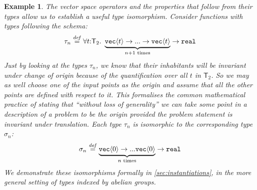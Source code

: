 \documentclass{sigplanconf}
\newcommand{\SynTransl}[1]{\mathsf{T}_#1}
\newcommand{\tyPrim}[2]{\textup{\texttt{#1}}\langle #2 \rangle}
\newcommand{\tyPrimNm}[1]{\textup{\texttt{#1}}}
\newcommand{\isDefinedAs}{\stackrel{\mathit{def}}=}
\theoremstyle{examplestyle}
\newtheorem{example}{Example}
\theoremstyle{restatementstyle}
\begin{document}
\begin{example}\label{ex:type-iso}
  The vector space operators and the properties that follow from their
  types allow us to establish a useful type isomorphism. Consider
  functions with types following the schema:
  \begin{displaymath}
    \tau_{n} \isDefinedAs \forall
    t\mathord:\SynTransl{2}.\ \underbrace{\tyPrim{vec}{t} \to ... \to
      \tyPrim{vec}{t}}_{n+1\textrm{ times}} \to \tyPrimNm{real}
  \end{displaymath}
  Just by looking at the types $\tau_{n}$, we know that their
  inhabitants will be invariant under change of origin because of the
  quantification over all $t$ in $\SynTransl{2}$. So we may as well
  choose one of the input points as the origin and assume that all the
  other points are defined with respect to it.  This formalises the
  common mathematical practice of stating that ``without loss of
  generality'' we can take some point in a description of a problem to
  be the origin provided the problem statement is invariant under
  translation. Each type $\tau_{n}$ is isomorphic to the corresponding
  type $\sigma_{n}$:
  \begin{displaymath}
    \sigma_{n} \isDefinedAs \underbrace{\tyPrim{vec}{0} \to
      ... \tyPrim{vec}{0}}_{n\textrm{ times}} \to \tyPrimNm{real}
  \end{displaymath}
  We demonstrate these isomorphisms formally in
  \autoref{sec:instantiations}, in the more general setting of types
  indexed by abelian groups.
\end{example}
\end{document}
